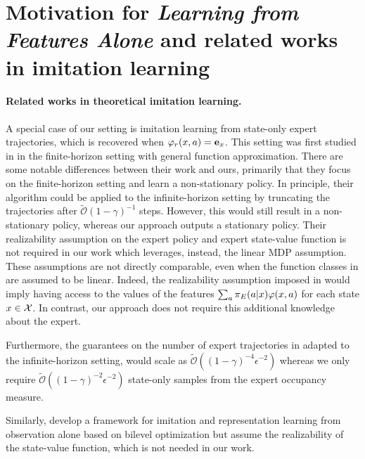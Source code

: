 \section{Motivation for \emph{Learning from Features Alone} and related works in imitation learning}
\label{app:related_works_IL}



\paragraph{Related works in theoretical imitation learning.} A special case of our setting is imitation learning from state-only expert trajectories, which is recovered when $\varphi_r (x,a) = \mathbf{e}_x$. 
This setting was first studied in \cite{sun2019provably} in the finite-horizon setting with general function approximation. 
There are some notable differences between their work and ours, primarily that they focus on the finite-horizon setting and learn a non-stationary policy. 
In principle, their algorithm could be applied to the infinite-horizon setting by truncating the trajectories after $\tilde{\mathcal{O}}(1-\gamma)^{-1}$ steps. 
However, this would still result in a non-stationary policy, whereas our approach outputs a stationary policy. 
Their realizability assumption on the expert policy and expert state-value function is not required in our work which leverages, instead, the linear MDP assumption. 
These assumptions are not directly comparable, even when the function classes in \cite{sun2019provably} are assumed to be linear. 
Indeed, the realizability assumption imposed in \cite{sun2019provably} would imply having access to the values of the features $\sum_a {\pi_E}(a|x) \varphi(x,a)$ for each state $x \in \mathcal{X}$. 
In contrast, our approach does not require this additional knowledge about the expert.

Furthermore, the guarantees on the number of expert trajectories in \cite[Theorem 3.3]{sun2019provably} adapted to the infinite-horizon setting, 
would scale as $\tilde{\mathcal{O}}((1-\gamma)^{-4} \epsilon^{-2})$ whereas we only require $\tilde{\mathcal{O}}((1-\gamma)^{-2} \epsilon^{-2})$ state-only samples from the expert occupancy measure.

Similarly, \cite{ADKLS20} develop a framework for imitation and representation learning from observation alone based on bilevel optimization but assume the realizability of the state-value function, which is not needed in our work.

